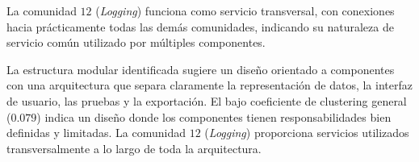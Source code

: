 \documentclass[12pt,letterpaper]{article}
\begin{document}
La comunidad $12$ (\textit{Logging}) funciona como servicio transversal, con conexiones hacia prácticamente todas las demás comunidades, indicando su naturaleza de servicio común utilizado por múltiples componentes. 

La estructura modular identificada sugiere un diseño orientado a componentes con una arquitectura que separa claramente la representación de datos, la interfaz de usuario, las pruebas y la exportación. El bajo coeficiente de clustering general ($0.079$) indica un diseño donde los componentes tienen responsabilidades bien definidas y limitadas. La comunidad $12$ (\textit{Logging}) proporciona servicios utilizados transversalmente a lo largo de toda la arquitectura.
\end{document}
